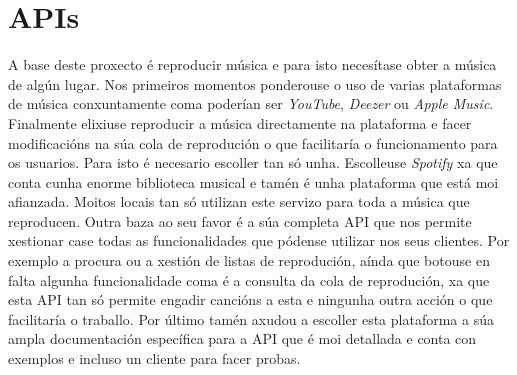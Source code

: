 \section{APIs}
A base deste proxecto é reproducir música e para isto necesítase obter a música de algún lugar. Nos primeiros momentos ponderouse o uso de varias plataformas de música conxuntamente coma poderían ser \textit{YouTube}, \textit{Deezer} ou \textit{Apple Music}. Finalmente elixiuse reproducir a música directamente na plataforma e facer modificacións na súa cola de reprodución o que facilitaría o funcionamento para os usuarios. Para isto é necesario escoller tan só unha. Escolleuse \textit{Spotify} xa que conta cunha enorme biblioteca musical e tamén é unha plataforma que está moi afianzada. Moitos locais tan só utilizan este servizo para toda a música que reproducen. Outra baza ao seu favor é a súa completa API que nos permite xestionar case todas as funcionalidades que pódense utilizar nos seus clientes. Por exemplo a procura ou a xestión de listas de reprodución, aínda que botouse en falta algunha funcionalidade coma é a consulta da cola de reprodución, xa que esta API tan só permite engadir cancións a esta e ningunha outra acción o que facilitaría o traballo. Por último tamén axudou a escoller esta plataforma a súa ampla documentación específica para a API que é moi detallada e conta con exemplos e incluso un cliente para facer probas.